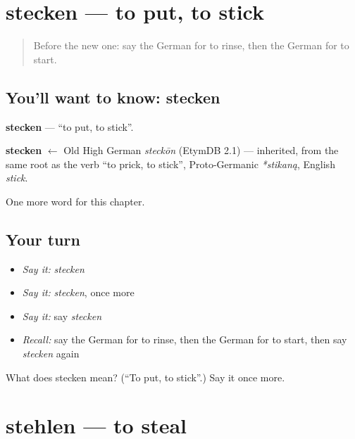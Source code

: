 \section[stecken]{stecken — to put, to stick}

\label{lesson:GE-C187-stecken}



\begin{quote}
Before the new one: say the German for to rinse, then the German for to start.
\end{quote}

\subsection*{You'll want to know: stecken}
\textbf{stecken} — \textquotedblleft{}to put, to stick\textquotedblright{}.

\begin{cousinweb}
\textbf{stecken} $\leftarrow$ Old High German \emph{steckōn} (EtymDB 2.1) — inherited, from the same root as the verb \textquotedblleft{}to prick, to stick\textquotedblright{}, Proto-Germanic \emph{*stikaną}, English \emph{stick}.
\end{cousinweb}

\begin{grammarlens}[title={What you've built}]
One more word for this chapter.
\end{grammarlens}

\subsection*{Your turn}
\begin{itemize}
\raggedright
  \item \emph{Say it:} \emph{stecken}
  \item \emph{Say it:} \emph{stecken}, once more
  \item \emph{Say it:} say \emph{stecken}
  \item \emph{Recall:} say the German for to rinse, then the German for to start, then say \emph{stecken} again
\end{itemize}

\begin{tcolorbox}[breakable,colback=teal!4,colframe=teal!35!black,title={Before you move on}]
What does stecken mean? (\textquotedblleft{}To put, to stick\textquotedblright{}.) Say it once more.
\end{tcolorbox}
\section[stehlen]{stehlen — to steal}

